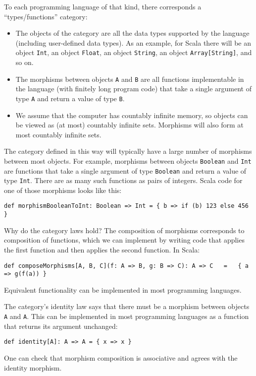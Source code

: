 To each programming language of that kind, there corresponds a \textsf{``}types/functions\textsf{''}
category:
\begin{itemize}
\item The objects of the category are all the data types supported by the
language (including user-defined data types). As an example, for Scala
there will be an object \lstinline!Int!, an object \lstinline!Float!,
an object \lstinline!String!, an object \lstinline!Array[String]!,
and so on.
\item The morphisms between objects \lstinline!A! and \lstinline!B! are
all functions implementable in the language (with finitely long program
code) that take a single argument of type \lstinline!A! and return
a value of type \lstinline!B!.
\item We assume that the computer has countably infinite memory, so objects
can be viewed as (at most) countably infinite sets. Morphisms will
also form at most countably infinite sets.
\end{itemize}
The category defined in this way will typically have a large number
of morphisms between most objects. For example, morphisms between
objects \lstinline!Boolean! and \lstinline!Int! are functions that
take a single argument of type \lstinline!Boolean! and return a value
of type \lstinline!Int!. There are as many such functions as pairs
of integers. Scala code for one of those morphisms looks like this:
\begin{lstlisting}
def morphismBooleanToInt: Boolean => Int = { b => if (b) 123 else 456 }
\end{lstlisting}

Why do the category laws hold? The composition of morphisms corresponds
to composition of functions, which we can implement by writing code
that applies the first function and then applies the second function.
In Scala:
\begin{lstlisting}
def composeMorphisms[A, B, C](f: A => B, g: B => C): A => C   =   { a => g(f(a)) }
\end{lstlisting}
Equivalent functionality can be implemented in most programming languages.

The category\textsf{'}s identity law says that there must be a morphism between
objects \lstinline!A! and \lstinline!A!. This can be implemented
in most programming languages as a function that returns its argument
unchanged:
\begin{lstlisting}
def identity[A]: A => A = { x => x }
\end{lstlisting}
One can check that morphism composition is associative and agrees
with the identity morphism.

